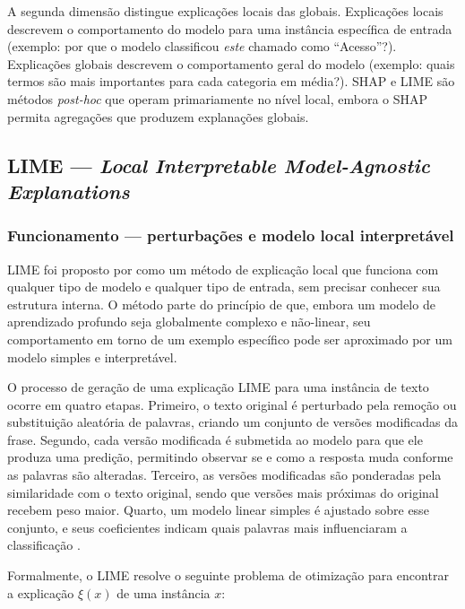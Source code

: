 \documentclass[
    12pt,                %
    openright,           %
    oneside,             %
    a4paper,             %
    english,             %
    brazil               %
]{abntex2}
\begin{document}
A segunda dimensão distingue explicações locais das globais. Explicações locais descrevem o comportamento do modelo para uma instância específica de entrada (exemplo: por que o modelo classificou \textit{este} chamado como ``Acesso''?). Explicações globais descrevem o comportamento geral do modelo (exemplo: quais termos são mais importantes para cada categoria em média?). SHAP e LIME são métodos \textit{post-hoc} que operam primariamente no nível local, embora o SHAP permita agregações que produzem explanações globais.

\subsection{LIME — \textit{Local Interpretable Model-Agnostic Explanations}}
\label{subsec:lime}

\subsubsection{Funcionamento — perturbações e modelo local interpretável}
\label{subsubsec:lime_funcionamento}

LIME foi proposto por  como um método de 
explicação local que funciona com qualquer tipo de modelo e qualquer 
tipo de entrada, sem precisar conhecer sua estrutura interna. O método 
parte do princípio de que, embora um modelo de aprendizado profundo 
seja globalmente complexo e não-linear, seu comportamento em torno 
de um exemplo específico pode ser aproximado por um modelo simples 
e interpretável.

O processo de geração de uma explicação LIME para uma instância de 
texto ocorre em quatro etapas. Primeiro, o texto original é perturbado 
pela remoção ou substituição aleatória de palavras, criando um conjunto 
de versões modificadas da frase. Segundo, cada versão modificada é 
submetida ao modelo para que ele produza uma predição, permitindo 
observar se e como a resposta muda conforme as palavras são alteradas. 
Terceiro, as versões modificadas são ponderadas pela similaridade com 
o texto original, sendo que versões mais próximas do original recebem 
peso maior. Quarto, um modelo linear simples é ajustado sobre esse 
conjunto, e seus coeficientes indicam quais palavras mais influenciaram 
a classificação \cite{ribeiro2016}.

Formalmente, o LIME resolve o seguinte problema de otimização 
para encontrar a explicação $\xi(x)$ de uma instância $x$:
\end{document}
